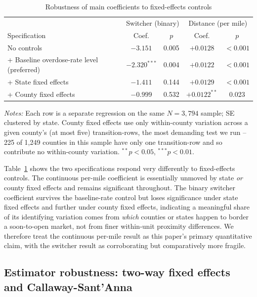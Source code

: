 \documentclass[12pt]{article}
\begin{document}
\begin{table}[htbp]
\centering
\caption{Robustness of main coefficients to fixed-effects controls}
\label{tab:fe}
\begin{tabular}{@{}lcccc@{}}
\toprule
 & \multicolumn{2}{c}{Switcher (binary)} & \multicolumn{2}{c}{Distance (per mile)} \\
Specification & Coef. & $p$ & Coef. & $p$ \\
\midrule
No controls & $-3.151$ & 0.005 & $+0.0128$ & $<0.001$ \\
+ Baseline overdose-rate level (preferred) & $-2.320^{***}$ & 0.004 & $+0.0122$ & $<0.001$ \\
+ State fixed effects & $-1.411$ & 0.144 & $+0.0129$ & $<0.001$ \\
+ County fixed effects & $-0.999$ & 0.532 & $+0.0122^{**}$ & 0.023 \\
\bottomrule
\end{tabular}
\vspace{2pt}
\begin{minipage}{0.92\textwidth}
\footnotesize\emph{Notes:} Each row is a separate regression on the
same $N=3{,}794$ sample; SE clustered by state. County fixed effects
use only within-county variation across a given county's (at most
five) transition-rows, the most demanding test we run -- 225 of 1,249
counties in this sample have only one transition-row and so contribute
no within-county variation. $^{**}p<0.05$, $^{***}p<0.01$.
\end{minipage}
\end{table}

Table~\ref{tab:fe} shows the two specifications respond very
differently to fixed-effects controls. The continuous per-mile
coefficient is essentially unmoved by state \emph{or} county fixed
effects and remains significant throughout. The binary switcher
coefficient survives the baseline-rate control but loses significance
under state fixed effects and further under county fixed effects,
indicating a meaningful share of its identifying variation comes from
\emph{which} counties or states happen to border a soon-to-open
market, not from finer within-unit proximity differences. We therefore
treat the continuous per-mile result as this paper's primary
quantitative claim, with the switcher result as corroborating but
comparatively more fragile.

\subsection{Estimator robustness: two-way fixed effects and Callaway-Sant'Anna}
\label{sec:twfecs}
\end{document}

